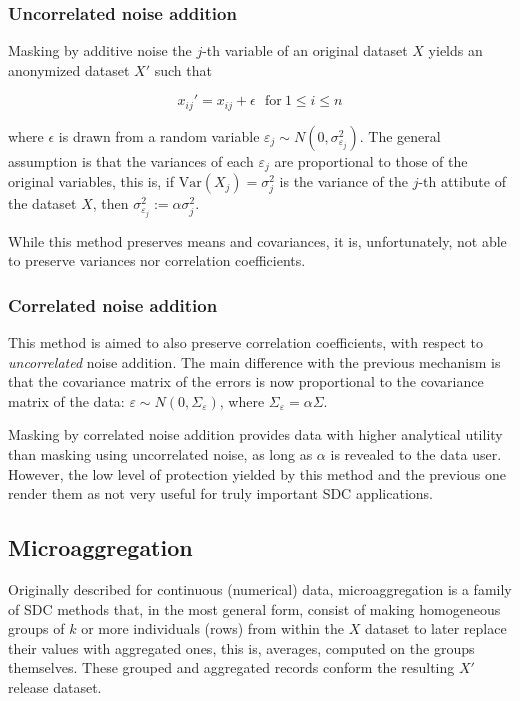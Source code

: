 \subsubsection{Uncorrelated noise addition}

Masking by additive noise the $j$-th variable of an original dataset $X$ yields an anonymized dataset $X'$ such that

\begin{equation}
x_{ij}' = x_{ij} + \epsilon\ \ \ \text{for}\ 1 \leq i \leq n
\end{equation}

where $\epsilon$ is drawn from a random variable $\varepsilon_j \sim N(0,\sigma_{\varepsilon_j}^2)$. The general assumption is that the variances of each $\varepsilon_j$ are proportional to those of the original variables, this is, if $\textrm{Var}(X_j) = \sigma_j^2$ is the variance of the $j$-th attibute of the dataset $X$, then $\sigma_{\varepsilon_j}^2 := \alpha\sigma_j^2$.

While this method preserves means and covariances, it is, unfortunately, not able to preserve variances nor correlation coefficients.

\subsubsection{Correlated noise addition}

This method is aimed to also preserve correlation coefficients, with respect to \textit{uncorrelated} noise addition. The main difference with the previous mechanism is that the covariance matrix of the errors is now proportional to the covariance matrix of the data: $\varepsilon \sim N(0,\Sigma_\varepsilon)$, where $\Sigma_\varepsilon = \alpha\Sigma$.

Masking by correlated noise addition provides data with higher analytical utility than masking using uncorrelated noise, as long as $\alpha$ is revealed to the data user. However, the low level of protection yielded by this method and the previous one render them as not very useful for truly important SDC applications.

\subsection{Microaggregation}
\label{Theory:SDCMethods:Microaggregation}

Originally described for continuous (numerical) data, microaggregation is a family of SDC methods that, in the most general form, consist of making homogeneous groups of $k$ or more individuals (rows) from within the $X$ dataset to later replace their values with aggregated ones, this is, averages, computed on the groups themselves. These grouped and aggregated records conform the resulting $X'$ release dataset.

